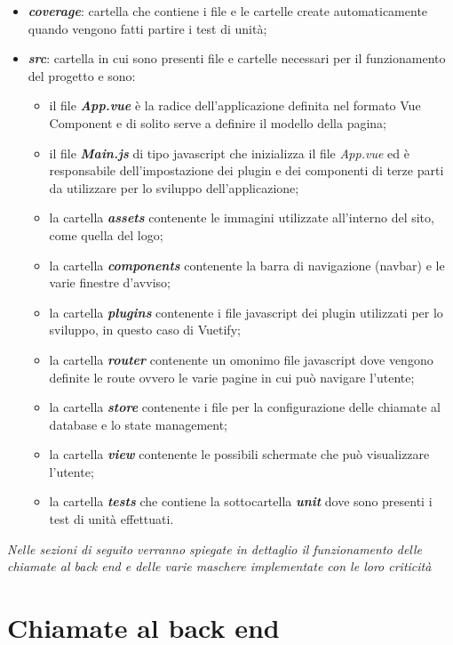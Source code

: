 \begin{itemize}
	\item \textbf{\textit{coverage}}: cartella che contiene i file e le cartelle create automaticamente quando vengono fatti partire i test di unità;
	\item \textbf{\textit{src}}: cartella in cui sono presenti file e cartelle necessari per il funzionamento del progetto e sono:
	\begin{itemize}
		\item il file \textbf{\textit{App.vue}} è la radice dell'applicazione definita nel formato Vue Component e di solito serve a definire il modello della pagina;
		\item il file \textbf{\textit{Main.js}} di tipo javascript che inizializza il file \textit{App.vue} ed è responsabile dell'impostazione dei plugin e dei componenti di terze parti da utilizzare per lo sviluppo dell'applicazione;
		\item la cartella \textbf{\textit{assets}} contenente le immagini utilizzate all'interno del sito, come quella del logo;
		\item la cartella \textbf{\textit{components}} contenente la barra di navigazione (navbar) e le varie finestre d'avviso;
		\item la cartella \textbf{\textit{plugins}} contenente i file javascript dei plugin utilizzati per lo sviluppo, in questo caso di Vuetify;
		\item la cartella \textbf{\textit{router}} contenente un omonimo file javascript dove vengono definite le route ovvero le varie pagine in cui può navigare l'utente;
		\item la cartella \textbf{\textit{store}} contenente i file per la configurazione delle chiamate al database e lo state management;
		\item la cartella \textbf{\textit{view}} contenente le possibili schermate che può visualizzare l'utente;
		\item la cartella \textbf{\textit{tests}} che contiene la sottocartella \textbf{\textit{unit}} dove sono presenti i test di unità effettuati.
	\end{itemize}
\end{itemize}

\textit{Nelle sezioni di seguito verranno spiegate in dettaglio il funzionamento delle chiamate al back end e delle varie maschere implementate con le loro criticità}

\section{Chiamate al back end}
\label{sec:chiamate-back-end}

